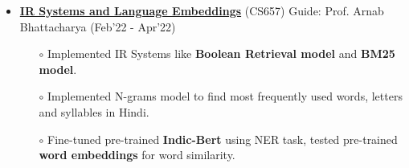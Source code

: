 \documentclass[10.8pt, a4paper]{extarticle}
\begin{document}
\begin{itemize}
    
    	\item \href{https://github.com/jeetsarangi/Experiments-with-Indian-Linguistic-Embeddings-and-Language-Corpora}{\textbf{IR Systems and Language Embeddings}} (CS657) Guide: Prof. Arnab Bhattacharya \hfill(Feb'22 - Apr'22)
	\\[-0.6cm]
	\begin{itemize}
	      \item[$\circ$] Implemented IR Systems like \textbf{Boolean Retrieval model} and \textbf{BM25 model}. \\[-0.6cm]
	      \item[$\circ$] Implemented N-grams model to find most frequently used words, letters and syllables in Hindi.\\[-0.6cm]
	      
	      \item[$\circ$] Fine-tuned pre-trained \textbf{Indic-Bert} using NER task, tested pre-trained \textbf{word embeddings} for word similarity. \\[-0.6cm]
	      
	\end{itemize}



	      

\end{itemize}
\end{document}
